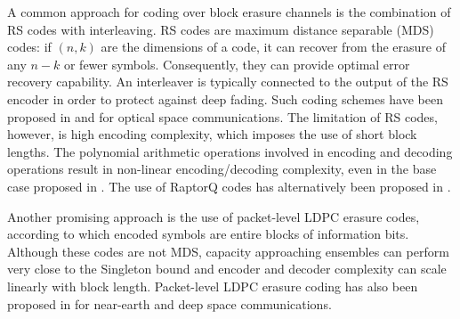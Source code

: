 A common approach for coding over block erasure channels is the combination of RS codes with interleaving. RS codes are maximum distance separable (MDS) codes: if $(n,k)$ are the dimensions of a code, it can recover from the erasure of any $n-k$ or fewer symbols. Consequently, they can provide optimal error recovery capability. An interleaver is typically connected to the output of the RS encoder in order to protect against deep fading. Such coding schemes have been proposed in \cite{CCSDS141} and \cite{CCSDS142} for optical space communications. The limitation of RS codes, however, is high encoding complexity, which imposes the use of short block lengths. The polynomial arithmetic operations involved in encoding and decoding operations result in non-linear encoding/decoding complexity, even in the base case proposed in \cite{Tang2020}. The use of RaptorQ codes has alternatively been proposed in \cite{Adhikary2020}.\par
Another promising approach is the use of packet-level LDPC erasure codes, according to which encoded symbols are entire blocks of information bits. Although these codes are not MDS, capacity approaching ensembles can perform very close to the Singleton bound \cite{GuilleniFabregas2006} and encoder and decoder complexity can scale linearly with block length. Packet-level LDPC erasure coding has also been proposed in \cite{CCSDS131.5} for near-earth and deep space communications.\par




